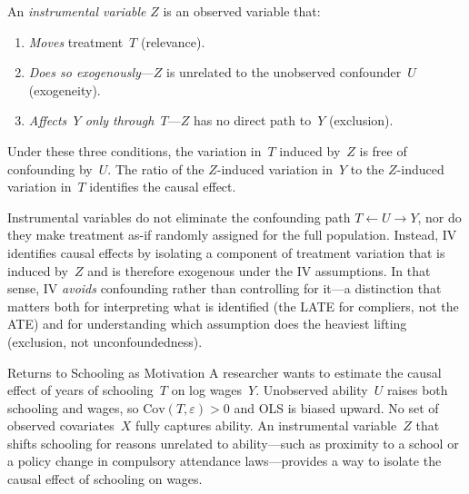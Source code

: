 \documentclass[master.tex]{subfiles}
\begin{document}
An \emph{instrumental variable} $Z$ is an observed variable that:
\begin{enumerate}
  \item \emph{Moves} treatment~$T$ (relevance).
  \item \emph{Does so exogenously}---$Z$ is unrelated to the
    unobserved confounder~$U$ (exogeneity).
  \item \emph{Affects~$Y$ only through~$T$}---$Z$ has no direct
    path to~$Y$ (exclusion).
\end{enumerate}
Under these three conditions, the variation in~$T$ induced by~$Z$
is free of confounding by~$U$.  The ratio of the $Z$-induced
variation in~$Y$ to the $Z$-induced variation in~$T$ identifies
the causal effect.

Instrumental variables do not eliminate the confounding path
$T \leftarrow U \rightarrow Y$, nor do they make treatment as-if
randomly assigned for the full population.  Instead, IV identifies
causal effects by isolating a component of treatment variation that
is induced by~$Z$ and is therefore exogenous under the IV
assumptions.  In that sense, IV \emph{avoids} confounding rather
than controlling for it---a distinction that matters both for
interpreting what is identified (the LATE for compliers, not the
ATE) and for understanding which assumption does the heaviest
lifting (exclusion, not unconfoundedness).

\begin{example}{Returns to Schooling as Motivation}
\label{w7:ex:schooling-motivation}
A researcher wants to estimate the causal effect of years of
schooling~$T$ on log wages~$Y$.  Unobserved ability~$U$ raises
both schooling and wages, so $\mathrm{Cov}(T, \varepsilon) > 0$
and OLS is biased upward.  No set of observed covariates~$X$
fully captures ability.  An instrumental variable~$Z$ that shifts
schooling for reasons unrelated to ability---such as proximity to
a school or a policy change in compulsory attendance laws---provides
a way to isolate the causal effect of schooling on wages.
\end{example}
\end{document}
